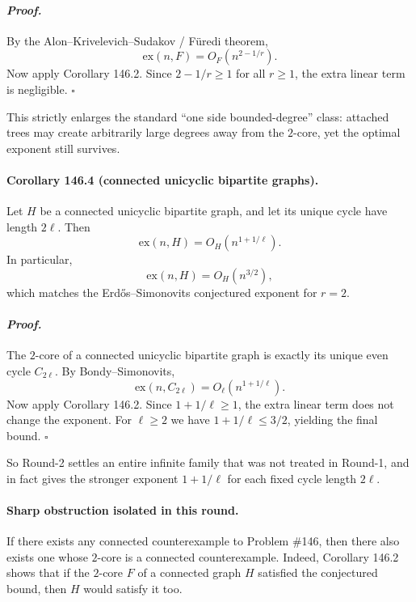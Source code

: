 \paragraph{\textit{Proof.}}
By the Alon--Krivelevich--Sudakov / F\"uredi theorem,
\[
\mathrm{ex}(n,F)=O_F(n^{2-1/r}).
\]
Now apply Corollary 146.2. Since $2-1/r\ge 1$ for all $r\ge 1$, the extra linear term is negligible.
\hfill $\square$

\medskip

This strictly enlarges the standard ``one side bounded-degree'' class: attached trees may create
arbitrarily large degrees away from the $2$-core, yet the optimal exponent still survives.

\paragraph{\textbf{Corollary 146.4 (connected unicyclic bipartite graphs).}}
Let $H$ be a connected unicyclic bipartite graph, and let its unique cycle have length $2\ell$.
Then
\[
\mathrm{ex}(n,H)=O_H(n^{1+1/\ell}).
\]
In particular,
\[
\mathrm{ex}(n,H)=O_H(n^{3/2}),
\]
which matches the Erd\H{o}s--Simonovits conjectured exponent for $r=2$.

\paragraph{\textit{Proof.}}
The $2$-core of a connected unicyclic bipartite graph is exactly its unique even cycle $C_{2\ell}$.
By Bondy--Simonovits,
\[
\mathrm{ex}(n,C_{2\ell})=O_\ell(n^{1+1/\ell}).
\]
Now apply Corollary 146.2. Since $1+1/\ell\ge 1$, the extra linear term does not change the exponent.
For $\ell\ge 2$ we have $1+1/\ell\le 3/2$, yielding the final bound. \hfill $\square$

\medskip

So Round-2 settles an entire infinite family that was not treated in Round-1, and in fact gives the
stronger exponent $1+1/\ell$ for each fixed cycle length $2\ell$.

\paragraph{\textbf{Sharp obstruction isolated in this round.}}
If there exists any connected counterexample to Problem \#146, then there also exists one whose
$2$-core is a connected counterexample. Indeed, Corollary 146.2 shows that if the $2$-core $F$ of a
connected graph $H$ satisfied the conjectured bound, then $H$ would satisfy it too.


